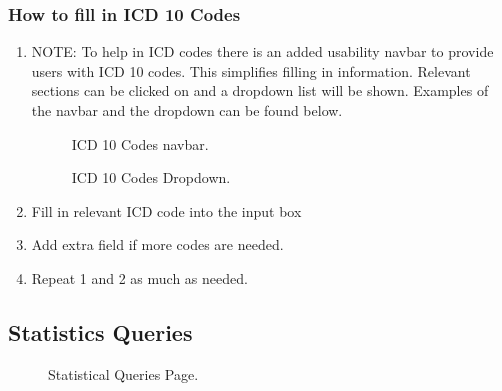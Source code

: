 \documentclass[14pt, a4paper]{article}
\begin{document}
\subsubsection{How to fill in ICD 10 Codes}
\begin{enumerate}
\item NOTE: To help in ICD codes there is an added usability navbar to provide users with ICD 10 codes. This simplifies filling in information. Relevant sections can be clicked on and a dropdown list will be shown. Examples of the navbar and the dropdown can be found below.
\begin{figure}[H]
\centerline{}
\caption{ICD 10 Codes navbar.}
\label{fig:forms2}
\end{figure}
\begin{figure}[H]
\centerline{}
\caption{ICD 10 Codes Dropdown.}
\label{fig:forms3}
\end{figure}
\item Fill in relevant ICD code into the input box
\item Add extra field if more codes are needed.
\item Repeat 1 and 2 as much as needed.
\end{enumerate}
\subsection{Statistics Queries}
\begin{figure}[H]
\centerline{}
\caption{Statistical Queries Page.}
\label{fig:statsQ1}
\end{figure}
\end{document}
